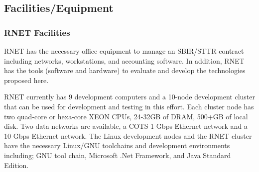 

\subsection{Facilities/Equipment}
\subsubsection{RNET Facilities}
RNET has the necessary office equipment to manage an SBIR/STTR contract
including networks, workstations, and accounting software. In
addition, RNET has the tools (software and hardware) to evaluate and
develop the technologies proposed here.  

RNET currently has 9 development computers and a 10-node development cluster 
that can be used for development and testing in this effort. Each cluster node 
has two quad-core or hexa-core XEON CPUs, 24-32GB of DRAM, 500+GB of local 
disk. 
Two data networks are available, a COTS 1 Gbps Ethernet network and a 10 Gbps 
Ethernet network. The Linux development nodes and the RNET cluster have the 
necessary Linux/GNU toolchains and development environments including; GNU 
tool chain, Microsoft .Net Framework, and Java Standard Edition.

